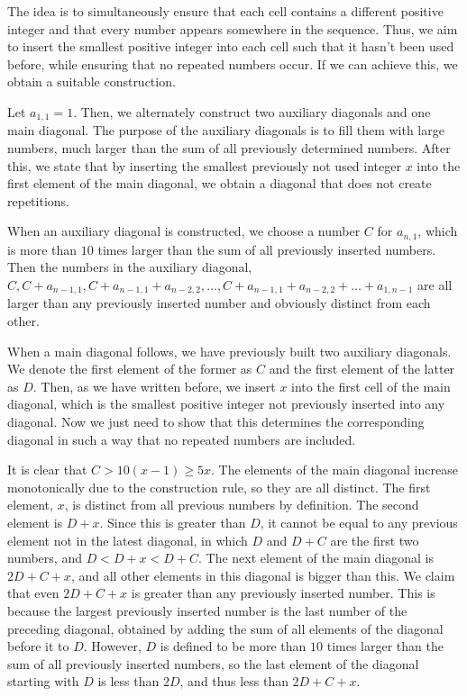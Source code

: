 \documentclass{article}
\begin{document}
The idea is to simultaneously ensure that each cell contains a different positive integer and that every number appears somewhere in the sequence. Thus, we aim to insert the smallest positive integer into each cell such that it hasn't been used before, while ensuring that no repeated numbers occur. If we can achieve this, we obtain a suitable construction.

Let \(\displaystyle a_{1,1}=1\). Then, we alternately construct two auxiliary diagonals and one main diagonal. The purpose of the auxiliary diagonals is to fill them with large numbers, much larger than the sum of all previously determined numbers. After this, we state that by inserting the smallest previously not used integer \(\displaystyle x\) into the first element of the main diagonal, we obtain a diagonal that does not create repetitions.

When an auxiliary diagonal is constructed, we choose a number \(\displaystyle C\) for \(\displaystyle a_{n,1}\), which is more than \(\displaystyle 10\) times larger than the sum of all previously inserted numbers. Then the numbers in the auxiliary diagonal, \(\displaystyle C, C+a_{n-1,1}, C+a_{n-1,1}+a_{n-2,2}, \ldots , C+a_{n-1,1}+a_{n-2,2}+\ldots +a_{1,n-1}\) are all larger than any previously inserted number and obviously distinct from each other.

When a main diagonal follows, we have previously built two auxiliary diagonals. We denote the first element of the former as \(\displaystyle C\) and the first element of the latter as \(\displaystyle D\). Then, as we have written before, we insert \(\displaystyle x\) into the first cell of the main diagonal, which is the smallest positive integer not previously inserted into any diagonal. Now we just need to show that this determines the corresponding diagonal in such a way that no repeated numbers are included.

It is clear that \(\displaystyle C>10(x-1)\ge 5x\). The elements of the main diagonal increase monotonically due to the construction rule, so they are all distinct. The first element, \(\displaystyle x\), is distinct from all previous numbers by definition. The second element is \(\displaystyle D+x\). Since this is greater than \(\displaystyle D\), it cannot be equal to any previous element not in the latest diagonal, in which \(\displaystyle D\) and \(\displaystyle D+C\) are the first two numbers, and \(\displaystyle D<D+x<D+C\). The next element of the main diagonal is \(\displaystyle 2D+C+x\), and all other elements in this diagonal is bigger than this. We claim that even \(\displaystyle 2D+C+x\) is greater than any previously inserted number. This is because the largest previously inserted number is the last number of the preceding diagonal, obtained by adding the sum of all elements of the diagonal before it to \(\displaystyle D\). However, \(\displaystyle D\) is defined to be more than \(\displaystyle 10\) times larger than the sum of all previously inserted numbers, so the last element of the diagonal starting with \(\displaystyle D\) is less than \(\displaystyle 2D\), and thus less than \(\displaystyle 2D+C+x\).
\end{document}
